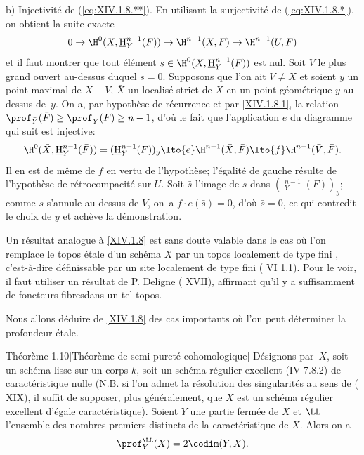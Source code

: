 b) Injectivit\'e de (\ref{eq:XIV.1.8.**}). En utilisant la surjectivit\'e de (\ref{eq:XIV.1.8.*}), on obtient la suite exacte
$$0\to \H^0(X, {\mathop{\underline{\mathrm{H}}}\nolimits}_Y^{n-1}(F))\to \H^{n-1}(X, F)\to \H^{n-1}(U, F)$$
et il faut montrer que tout \'el\'ement $s\in \H^0(X, {\mathop{\underline{\mathrm{H}}}\nolimits}_Y^{n-1}(F))$ est nul. Soit $V$ le plus grand ouvert au-dessus duquel $s=0$. Supposons que l'on ait $V\neq X$ et soient $y$ un point maximal de $X-V$, $\bar X$ un localis\'e strict de $X$ en un point g\'eom\'etrique $\bar y$ au-dessus de~$y$. On a, par hypoth\`ese de r\'ecurrence et par \ref{XIV.1.8.1}, la relation $\prof_{\bar Y}(\bar F)\geq \prof_Y(F)\geq n-1$, d'o\`u le fait que l'application $e$ du diagramme qui suit est injective:
$$
\H^0(\bar X, {\mathop{\underline{\mathrm{H}}}\nolimits}_Y^{n-1}(\bar F))= ({\mathop{\underline{\mathrm{H}}}\nolimits}_Y^{n-1}(F))_{\bar y}\lto{e} \H^{n-1}(\bar X, \bar F) \lto{f} \H^{n-1}(\bar V, \bar F).
$$
Il en est de m\^eme de $f$ en vertu de l'hypoth\`ese; l'\'egalit\'e de gauche r\'esulte de l'hypoth\`ese de r\'etrocompacit\'e sur $U$. Soit $\bar s$ l'image de $s$ dans $({\mathop{\underline{\mathrm{H}}}\nolimits}_Y^{n-1}(F))_{\bar y}$; comme $s$ s'annule au-dessus de $V$, on~a $f\cdot e(\bar s)=0$, d'o\`u $\bar s=0$, ce qui contredit le choix de $y$ et ach\`eve la d\'emonstration.

\begin{remarque} \label{XIV.1.9}
Un r\'esultat analogue \`a \ref{XIV.1.8} est sans doute valable dans le cas o\`u l'on remplace le topos \'etale d'un sch\'ema $X$ par un \og topos localement de type fini \fg, c'est-\`a-dire d\'efinissable par un site localement de type fini ( VI 1.1). Pour le voir, il faut utiliser un r\'esultat de P. Deligne ( XVII), affirmant qu'il y a \og suffisamment de foncteurs fibres\fg dans un tel topos.
\end{remarque}

Nous allons d\'eduire de \ref{XIV.1.8} des cas importants o\`u l'on peut d\'eterminer la profondeur \'etale.

\label{XIV.1.10}
\begin{enonce*}{Th\'eor\`eme 1.10}[Th\'eor\`eme de semi-puret\'e cohomologique\ndemark]
D\'esignons par~$X$, soit un sch\'ema lisse sur un corps $k$, soit un sch\'ema r\'egulier excellent \textup{(\EGA IV 7.8.2)} de caract\'eristique nulle (N.B. si l'on admet la r\'esolution des singularit\'es au sens de \textup{( XIX)}, il suffit de supposer, plus g\'en\'eralement, que $X$ est un sch\'ema r\'egulier excellent d'\'egale caract\'eristique). Soient $Y$ une partie ferm\'ee de $X$ et $\LL$ l'ensemble des nombres premiers distincts de la caract\'eristique de $X$. Alors on a
$$
\prof_Y^{\LL}(X)=2\codim(Y, X).
$$
\end{enonce*}

